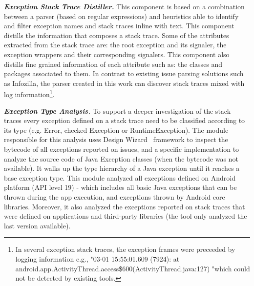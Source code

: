 \documentclass[conference]{IEEEtran}
\begin{document}
\emph{\textbf{Exception Stack Trace Distiller.}}
This component is based on a combination between a parser (based on regular expressions) 
and heuristics able to identify and filter exception names and stack traces inline with text. 
This component distills the information that composes a stack trace.
 Some of the attributes extracted from the stack trace are:
 the root exception and its signaler, the exception wrappers and their corresponding signalers. 
This component also distills fine grained information of each attribute such as: the classes and packages associated to them.
In contrast to existing issue parsing solutions such as Infozilla, the parser
created in this work can discover stack traces mixed with log information\footnote{In several 
exception stack traces, the exception frames were preceeded by logging information e.g., 
"03-01 15:55:01.609 (7924): at android.app.ActivityThread.access\$600(ActivityThread.java:127) 
"which could not be detected by existing tools.}.

\emph{\textbf{Exception Type Analysis.}} To support a deeper investigation of the 
stack traces every exception defined on a stack trace need to be classified according to its type
(e.g. Error, checked Exception or RuntimeException). The module responsible for this analysis 
uses Design Wizard~\cite{Brunet09} framework to inspect the bytecode of all exceptions reported on issues,
and a specific implementation to analyze the source code of Java Exception classes (when the
bytecode was not available). It walks up the type hierarchy of a Java exception until it reaches a base exception type.
This module analyzed all exceptions defined on Android platform (API level 19) - 
which includes all basic Java exceptions that can be thrown during the app execution,
and exceptions thrown by Android core libraries. Moreover, it also analyzed the 
exceptions reported on stack traces that were defined on applications and third-party libraries 
(the tool only analyzed the last version available).
\end{document}
